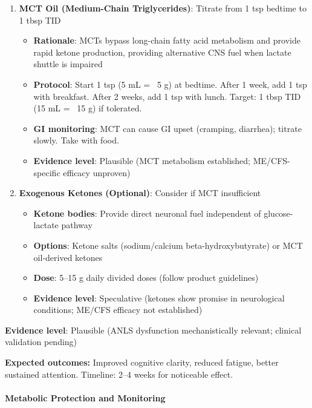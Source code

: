 \begin{protocol}
\begin{recommendation}
\begin{enumerate}
    \item \textbf{MCT Oil (Medium-Chain Triglycerides)}: Titrate from 1 tsp bedtime to 1 tbsp TID
    \begin{itemize}
        \item \textbf{Rationale}: MCTs bypass long-chain fatty acid metabolism and provide rapid ketone production, providing alternative CNS fuel when lactate shuttle is impaired
        \item \textbf{Protocol}: Start 1 tsp (5 mL = ~5 g) at bedtime. After 1 week, add 1 tsp with breakfast. After 2 weeks, add 1 tsp with lunch. Target: 1 tbsp TID (15 mL = ~15 g) if tolerated.
        \item \textbf{GI monitoring}: MCT can cause GI upset (cramping, diarrhea); titrate slowly. Take with food.
        \item \textbf{Evidence level}: Plausible (MCT metabolism established; ME/CFS-specific efficacy unproven)
    \end{itemize}

    \item \textbf{Exogenous Ketones (Optional)}: Consider if MCT insufficient
    \begin{itemize}
        \item \textbf{Ketone bodies}: Provide direct neuronal fuel independent of glucose-lactate pathway
        \item \textbf{Options}: Ketone salts (sodium/calcium beta-hydroxybutyrate) or MCT oil-derived ketones
        \item \textbf{Dose}: 5--15 g daily divided doses (follow product guidelines)
        \item \textbf{Evidence level}: Speculative (ketones show promise in neurological conditions; ME/CFS efficacy not established)
    \end{itemize}
\end{enumerate}

\textbf{Evidence level}: Plausible (ANLS dysfunction mechanistically relevant; clinical validation pending)

\textbf{Expected outcomes:} Improved cognitive clarity, reduced fatigue, better sustained attention. Timeline: 2--4 weeks for noticeable effect.

\end{recommendation}

\paragraph{Metabolic Protection and Monitoring}


\end{protocol}
